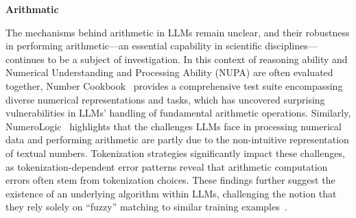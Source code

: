 {%


\textbf{Arithmatic}

The mechanisms behind arithmetic in LLMs remain unclear, and their robustness in performing arithmetic—an essential capability in scientific disciplines—continues to be a subject of investigation. In this context of reasoning ability and Numerical Understanding and Processing Ability (NUPA) are often evaluated together, Number Cookbook~\cite{yang2024number} provides a comprehensive test suite encompassing diverse numerical representations and tasks, which has uncovered surprising vulnerabilities in LLMs' handling of fundamental arithmetic operations. Similarly, NumeroLogic~\cite{schwartz2024numerologic} highlights that the challenges LLMs face in processing numerical data and performing arithmetic are partly due to the non-intuitive representation of textual numbers. Tokenization strategies significantly impact these challenges, as tokenization-dependent error patterns reveal that arithmetic computation errors often stem from tokenization choices. These findings further suggest the existence of an underlying algorithm within LLMs, challenging the notion that they rely solely on “fuzzy” matching to similar training examples~\cite{singh2024tokenization}.
}
\fi







\iffalse
\begin{itemize}
    \item The emergence of reasoning model: xxx
    \item CLIMATE Perdiction models
    \item CLIMAQA / ClimateGPT: Text definition benchmarj
    \item Reasoning model bench: AIME2024 (Math) Math Reasoning and GPQA(Science): A Graduate-Level Google-Proof Q\&A Benchmark
    \item Science + Numerical Value Variation: + Structural Variation: MM-PhyQA: Multimodal Physics Question-Answering  With Multi-Image CoT Prompting
    \item SCIBENCH: Evaluating College-Level Scientific Problem-Solving Abilities of  Large Language Models: that no single prompting strategy significantly outperforms the others and some strategies that demonstrate improvements in certain problem-solving skills could result in declines in other skills.
    \item: The Impact of Reasoning Step Length on Large Language Models: Reasoning step is important in Cot prompt
\end{itemize}
\fi


